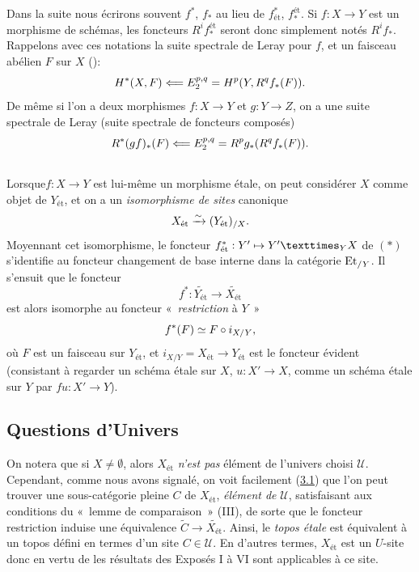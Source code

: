 \documentclass[10pt]{../fichiers-configuration-latex/smfart}
\begin{document}
Dans la suite nous écrirons souvent $f^{\ast}$, $f_{\ast}$ au lieu
de $f^{\ast}_{\text{ét}}$, $f^{\text{ét}}_{\ast}$. Si $f : X \to Y$
est un morphisme de schémas, les foncteurs $R^{i}
f_{\ast}^{\text{ét}}$ seront donc simplement notés $R^{i} f_{\ast}$.
Rappelons avec ces notations la suite spectrale de Leray pour $f$,
et un faisceau abélien $F$ sur $X$ ():
$$
H^{\ast} (X, F) \Longleftarrow E^{p, q}_2 = H^{p}(Y, R^q f_\ast (F)){}.
$$
De même si l'on a deux morphismes $f : X \to Y$ et $g : Y \to Z$, on
a une suite spectrale de Leray (suite spectrale de foncteurs
composés)
$$
R^{\ast} (gf)_{\ast} (F) \Longleftarrow E^{p, q}_2 = R^{p} g_{\ast} (R^q
f_\ast (F)){}.
$$

\subsection{}

Lorsque\pageoriginale $f : X \to Y$ est lui-même un morphisme étale, on peut
considérer $X$ comme objet de $Y_{\text{ét}}$, et on a un \emph{isomorphisme
  de sites} canonique
$$
X_{\text{ét}} \xrightarrow{\sim} (Y_{\text{ét}})_{/X}{}.
$$
Moyennant cet isomorphisme, le foncteur $f^{\ast}_{\text{ét}} : Y'\mapsto
\fprod{Y'}{X}{Y}$ de $(\ast)$ s'identifie au foncteur changement de base
interne dans la catégorie $\operatorname{Et}_{/Y}$. Il s'ensuit que le foncteur
$$
f^{\ast} : \widetilde{Y_{\text{ét}}} \to \widetilde{X_{\text{ét}}}
$$
est alors isomorphe au foncteur « \emph{restriction} à $Y$ »
$$
f^{\ast} (F) \simeq F \circ i_{X/Y}{},
$$
où $F$ est un faisceau sur $Y_{\text{ét}}$, et $i_{X/Y} =
X_{\text{ét}} \to Y_{\text{ét}}$
est le foncteur évident (consistant à regarder un schéma étale sur
$X$, $u : X'\to X$, comme un schéma étale sur $Y$ par $fu : X'\to Y$).

\subsection{Questions d'Univers}

On notera que si $X \neq ∅$, alors $X_{\text{ét}}$
\emph{n'est pas} élément de l'univers choisi $𝒰$. Cependant,
comme nous avons signalé, on voit facilement (\hyperref[VII.prop3.1]{3.1}) que
l'on peut trouver une sous-catégorie pleine $C$ de $X_{\text{ét}}$,
\emph{élément de} $𝒰$, satisfaisant aux conditions du « lemme de comparaison » (III), de sorte que le foncteur restriction
induise une équivalence $\widetilde{C} \to
\widetilde{X_{\text{ét}}}$. Ainsi, le \emph{topos étale} est
équivalent à un topos défini en termes d'un site $C \in 𝒰$.
En d'autres termes, $X_{\text{ét}}$ est un $U$-site donc en vertu de
\loccit les résultats des Exposés I à VI sont applicables à ce site.
\end{document}
